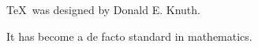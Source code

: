 \documentclass{article}
\begin{document}
\TeX\ was designed by Donald E. Knuth.

It has become a de facto standard in mathematics.
\end{document}
